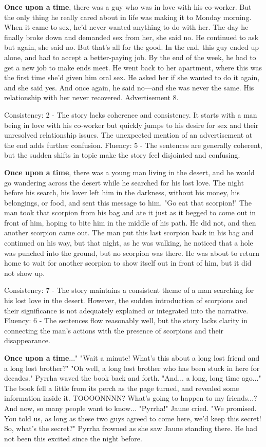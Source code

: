 \documentclass{article}
\begin{document}
\textbf{Once upon a time}, there was a guy who was in love with his co-worker. But the only thing he really cared about in life was making it to Monday morning. When it came to sex, he'd never wanted anything to do with her. The day he finally broke down and demanded sex from her, she said no. He continued to ask but again, she said no. But that's all for the good. In the end, this guy ended up alone, and had to accept a better-paying job. By the end of the week, he had to get a new job to make ends meet. He went back to her apartment, where this was the first time she'd given him oral sex. He asked her if she wanted to do it again, and she said yes. And once again, he said no—and she was never the same. His relationship with her never recovered. Advertisement 8.

Consistency: 2 - The story lacks coherence and consistency. It starts with a man being in love with his co-worker but quickly jumps to his desire for sex and their unresolved relationship issues. The unexpected mention of an advertisement at the end adds further confusion.
Fluency: 5 - The sentences are generally coherent, but the sudden shifts in topic make the story feel disjointed and confusing.

\textbf{Once upon a time}, there was a young man living in the desert, and he would go wandering across the desert while he searched for his lost love. The night before his search, his lover left him in the darkness, without his money, his belongings, or food, and sent this message to him. "Go eat that scorpion!" The man took that scorpion from his bag and ate it just as it begged to come out in front of him, hoping to bite him in the middle of his path. He did not, and then another scorpion came out. The man put this last scorpion back in his bag and continued on his way, but that night, as he was walking, he noticed that a hole was punched into the ground, but no scorpion was there. He was about to return home to wait for another scorpion to show itself out in front of him, but it did not show up.

Consistency: 7 - The story maintains a consistent theme of a man searching for his lost love in the desert. However, the sudden introduction of scorpions and their significance is not adequately explained or integrated into the narrative.
Fluency: 6 - The sentences flow reasonably well, but the story lacks clarity in connecting the man's actions with the presence of scorpions and their disappearance.

\textbf{Once upon a time}..." "Wait a minute! What's this about a long lost friend and a long lost brother?" "Oh well, a long lost brother who has been stuck in here for decades." Pyrrha waved the book back and forth. "And... a long, long time ago..." The book fell a little from its perch as the page turned, and revealed some information inside it. TOOOONNNN? What's going to happen to my friends...? And now, so many people want to know... "Pyrrha!" Jaune cried. "We promised. You told us, as long as these two guys agreed to come here, we'd keep this secret! So, what's the secret?" Pyrrha frowned as she saw Jaune standing there. He had not been this excited since the night before.
\end{document}
